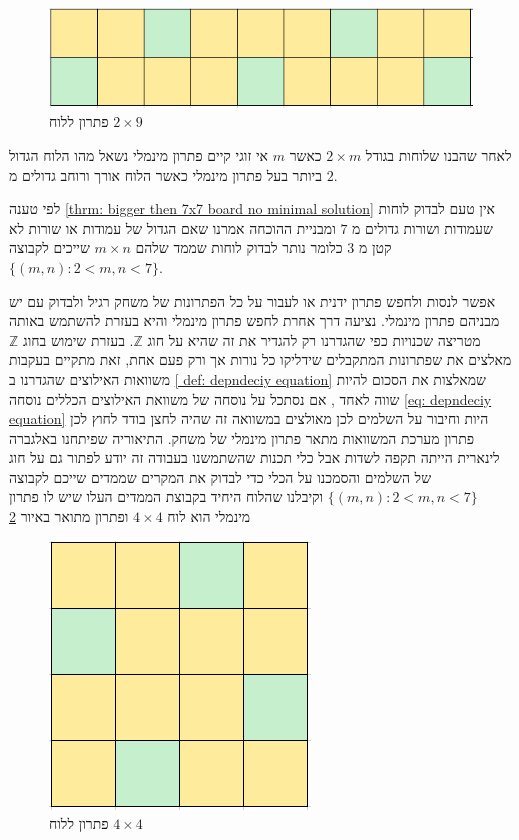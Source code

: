 \documentclass[12pt,twoside]{article}
\begin{document}
\begin{figure}[ht]
    \caption{פתרון ללוח 
    $2 \times 9$}
    \label{fig: 2x9 have min sol}
    \centering
    \includegraphics[width=.7\textwidth,height=.7\textheight,keepaspectratio]{images/2xm_sol.PNG}
\end{figure}

לאחר שהבנו שלוחות בגודל 
$2 \times m$
כאשר 
$m$
אי זוגי 
קיים פתרון מינמלי נשאל מהו הלוח 
הגדול ביותר
בעל פתרון מינמלי כאשר 
הלוח אורך ורוחב גדולים מ
$2$.

לפי טענה 
\ref{thrm: bigger then 7x7 board no minimal solution} 
אין טעם לבדוק לוחות שעמודות ושורות גדולים מ
$7$
ומבניית ההוכחה 
אמרנו שאם 
הגדול של עמודות או שורות לא קטן
מ
$3$
כלומר נותר לבדוק לוחות שממד שלהם 
$m \times n$
שייכים לקבוצה
$\{ (m,n) : 2 < m,n <7 \}$.

אפשר לנסות ולחפש פתרון ידנית
או לעבור על כל הפתרונות של משחק רגיל ולבדוק עם יש מבניהם פתרון 
מינמלי.
נציעה דרך אחרת לחפש פתרון 
מינמלי
והיא בעזרת להשתמש באותה מטריצה שכנויות כפי שהגדרנו רק להגדיר 
את זה שהיא על חוג 
$\mathbb{Z}$.
בעזרת שימוש בחוג 
$\mathbb{Z}$
מאלצים את שפתרונות המתקבלים
שידליקו כל נורות אך ורק פעם אחת,
זאת מתקיים בעקבות 
משוואות האילוצים שהגדרנו ב
\ref{ def: depndeciy equation}
שמאלצות את הסכום להיות שווה לאחד
,
אם נסתכל על נוסחה של משוואת האילוצים הכללים 
נוסחה
\ref{eq: depndeciy equation}
היות וחיבור על השלמים לכן 
מאולצים במשוואה זה שהיה לחצן בודד לחוץ 
לכן פתרון מערכת המשוואות מתאר פתרון 
מינמלי של משחק.
התיאוריה שפיתחנו באלגברה לינארית הייתה תקפה לשדות 
אבל כלי תכנות שהשתמשנו
בעבודה זה יודע לפתור גם על חוג של השלמים 
והסמכנו על הכלי כדי לבדוק את המקרים
שממדים שייכם לקבוצה 
$\{ (m,n) : 2 < m,n <7 \}$
וקיבלנו שהלוח
היחיד בקבוצת הממדים העלו שיש לו פתרון מינמלי 
הוא
לוח 
$4 \times 4$
ופתרון מתואר באיור 
\ref{fig:4x4_have_min_sol}

\begin{figure}[ht]
    \caption{פתרון ללוח 
    $4 \times 4$}
    \label{fig:4x4_have_min_sol}
    \centering
    \includegraphics[width=.5\textwidth,height=.5\textheight,keepaspectratio]{images/4x4_min_sol.PNG}
\end{figure}
\end{document}
